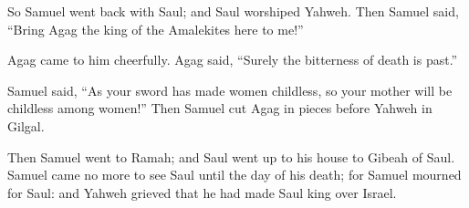 {\par }{\PP {}So Samuel went back with Saul; and Saul worshiped Yahweh.
Then Samuel said, “Bring Agag the king of the Amalekites here to me!”
\par }{\PP Agag came to him cheerfully. Agag said, “Surely the bitterness of death is past.”
\par }{\PP {}Samuel said, “As your sword has made women childless, so your mother will be childless among women!” Then Samuel cut Agag in pieces before Yahweh in Gilgal.
\par }{\PP {}Then Samuel went to Ramah; and Saul went up to his house to Gibeah of Saul.
Samuel came no more to see Saul until the day of his death; for Samuel mourned for Saul: and Yahweh grieved that he had made Saul king over Israel.

}
